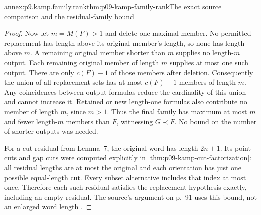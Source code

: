 \begin{annexitem}{annex:p9.kamp.family.rank}{thm:p09-kamp-family-rank}{The exact source comparison and the residual-family bound}
\begin{proof}
Now let \(m=M(F)>1\) and delete one maximal member. No permitted
replacement has length above its original member's length, so none
has length above \(m\). A remaining original member shorter than
\(m\) supplies no length-\(m\) output. Each remaining original
member of length \(m\) supplies at most one such output. There
are only \(c(F)-1\) of those members after deletion. Consequently
the union of all replacement sets has at most \(c(F)-1\) members
of length \(m\). Any coincidences between output formulas reduce
the cardinality of this union and cannot increase it. Retained or
new length-one formulas also contribute no member of length \(m\),
since \(m>1\). Thus the final family has maximum at most \(m\)
and fewer length-\(m\) members than \(F\), witnessing \(G\prec F\).
No bound on the number of shorter outputs was needed.

For a cut residual from Lemma~7, the original word has length
\(2n+1\). Its point cuts and gap cuts were computed explicitly
in \cref{thm:p09-kamp-cut-factorization}: all residual lengths
are at most the original and each orientation has just one possible
equal-length cut. Every subset alternative includes that index at
most once. Therefore each such residual satisfies the replacement
hypothesis exactly, including an empty residual. The source's argument
on p.~91 uses this bound, not an enlarged word length
\cite[ch.~III, pp.~83, 91]{Kamp1968}.
\end{proof}
\end{annexitem}


